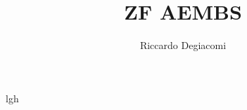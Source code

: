 \documentclass[a4paper,landscape,8pt]{extarticle}
\title{ZF AEMBS}
\author{Riccardo Degiacomi}
\begin{document}
	\begin{multicols*}{3}
lgh
	\end{multicols*}
\end{document}
